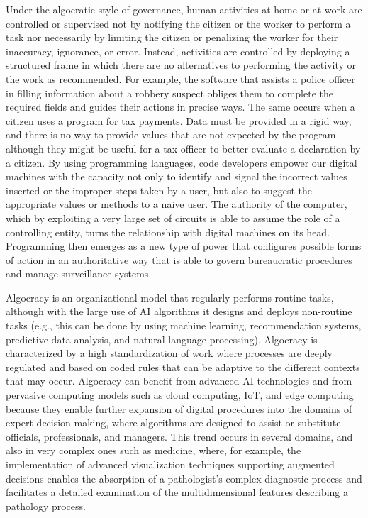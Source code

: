 Under the algocratic style of governance, human activities at home or at work are controlled or supervised not by notifying the citizen or the worker to perform a task nor necessarily by limiting the citizen or penalizing the worker for their inaccuracy, ignorance, or error. Instead, activities are controlled by deploying a structured frame in which there are no alternatives to performing the activity or the work as recommended. For example, the software that assists a police officer in filling information about a robbery suspect obliges them to complete the required fields and guides their actions in precise ways. The same occurs when a citizen uses a program for tax payments. Data must be provided in a rigid way, and there is no way to provide values that are not expected by the program although they might be useful for a tax officer to better evaluate a declaration by a citizen. By using programming languages, code developers empower our digital machines with the capacity not only to identify and signal the incorrect values inserted or the improper steps taken by a user, but also to suggest the appropriate values or methods to a naive user. The authority of the computer, which by exploiting a very large set of circuits is able to assume the role of a controlling entity, turns the relationship with digital machines on its head. Programming then emerges as a new type of power that configures possible forms of action in an authoritative way that is able to govern bureaucratic procedures and manage surveillance systems.

Algocracy is an organizational model that regularly performs routine tasks, although with the large use of AI algorithms it designs and deploys non-routine tasks (e.g., this can be done by using machine learning, recommendation systems, predictive data analysis, and natural language processing). Algocracy is characterized by a high standardization of work where processes are deeply regulated and based on coded rules that can be adaptive to the different contexts that may occur. Algocracy can benefit from advanced AI technologies and from pervasive computing models such as cloud computing, IoT, and edge computing because they enable further expansion of digital procedures into the domains of expert decision-making, where algorithms are designed to assist or substitute officials, professionals, and managers. This trend occurs in several domains, and also in very complex ones such as medicine, where, for example, the implementation of advanced visualization techniques supporting augmented decisions enables the absorption of a pathologist's complex diagnostic process and facilitates a detailed examination of the multidimensional features describing a pathology process.

